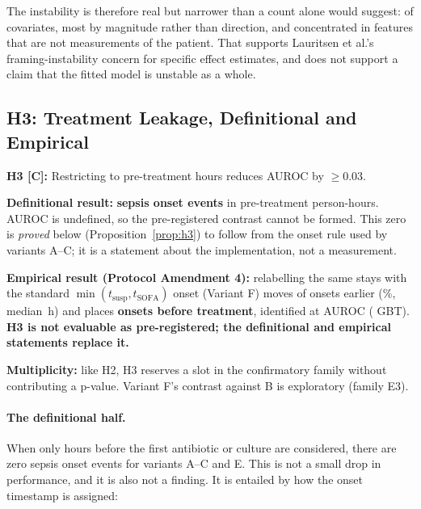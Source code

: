 The instability is therefore real but narrower than a count alone would suggest:
\pcHTwoEst{} of \pcHTwoNTerms{} covariates, most by magnitude rather than
direction, and concentrated in features that are not measurements of the
patient. That supports Lauritsen et al.'s \cite{lauritsen2021framing}
framing-instability concern for specific effect estimates, and does not support
a claim that the fitted model is unstable as a whole.

\subsection{H3: Treatment Leakage, Definitional and Empirical}
\label{sec:h3}

\begin{mdframed}[backgroundcolor=ATUPurple!10, linecolor=ATUPurple]
    \textbf{H3 [C]:} Restricting to pre-treatment hours reduces AUROC by
    $\geq 0.03$.

    \textbf{Definitional result:} \textbf{\pcPreTreatOnsetsVarB{} sepsis onset
    events} in \pcPreTreatPersonHoursVarB{} pre-treatment person-hours. AUROC is
    undefined, so the pre-registered contrast cannot be formed. This zero is
    \emph{proved} below (Proposition~\ref{prop:h3}) to follow from the onset
    rule used by variants A--C; it is a statement about the implementation, not
    a measurement.

    \textbf{Empirical result (Protocol Amendment 4):} relabelling the same
    stays with the standard $\min(t_{\text{susp}}, t_{\text{SOFA}})$ onset
    (Variant F) moves \pcFNMovedEarlier{} of \pcFNOnsets{} onsets earlier
    (\pcFPctMovedEarlier\%, median \pcFMedianShiftH\,h) and places
    \textbf{\pcPreTreatOnsetsVarF{} onsets before treatment}, identified at
    \pcPreTreatAurocPrimaryF{} AUROC (\pcPreTreatAurocGbtF{} GBT).
    \textbf{H3 is not evaluable as pre-registered; the definitional and
    empirical statements replace it.}

    \textbf{Multiplicity:} like H2, H3 reserves a slot in the confirmatory
    family without contributing a p-value. Variant F's contrast against B is
    exploratory (family E3).
\end{mdframed}

\paragraph{The definitional half.}
When only hours before the first antibiotic or culture are considered, there
are zero sepsis onset events for variants A--C and E. This is not a small drop
in performance, and it is also not a finding. It is entailed by how the onset
timestamp is assigned:

